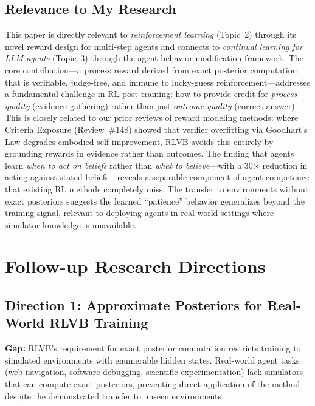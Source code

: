 \documentclass[11pt,a4paper]{article}
\begin{document}
\subsection{Relevance to My Research}
This paper is directly relevant to \emph{reinforcement learning} (Topic~2) through its novel reward design for multi-step agents and connects to \emph{continual learning for LLM agents} (Topic~3) through the agent behavior modification framework. The core contribution---a process reward derived from exact posterior computation that is verifiable, judge-free, and immune to lucky-guess reinforcement---addresses a fundamental challenge in RL post-training: how to provide credit for \emph{process quality} (evidence gathering) rather than just \emph{outcome quality} (correct answer). This is closely related to our prior reviews of reward modeling methods: where Criteria Exposure (Review~\#148) showed that verifier overfitting via Goodhart's Law degrades embodied self-improvement, RLVB avoids this entirely by grounding rewards in evidence rather than outcomes. The finding that agents learn \emph{when to act on beliefs} rather than \emph{what to believe}---with a 30$\times$ reduction in acting against stated beliefs---reveals a separable component of agent competence that existing RL methods completely miss. The transfer to environments without exact posteriors suggests the learned ``patience'' behavior generalizes beyond the training signal, relevant to deploying agents in real-world settings where simulator knowledge is unavailable.

\section{Follow-up Research Directions}

\subsection{Direction 1: Approximate Posteriors for Real-World RLVB Training}
\textbf{Gap:} RLVB's requirement for exact posterior computation restricts training to simulated environments with enumerable hidden states. Real-world agent tasks (web navigation, software debugging, scientific experimentation) lack simulators that can compute exact posteriors, preventing direct application of the method despite the demonstrated transfer to unseen environments.
\end{document}
